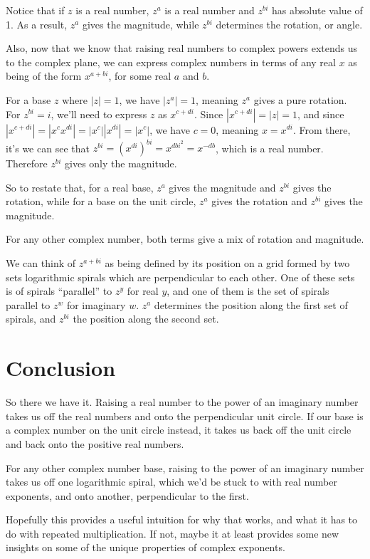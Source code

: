\documentclass[11pt, oneside]{article}   	%
\begin{document}
Notice that if $z$ is a real number, $z^a$ is a real number and $z^{bi}$ has absolute value of 1.
As a result, $z^a$ gives the magnitude, while $z^{bi}$ determines the rotation, or angle.

Also, now that we know that raising real numbers to complex powers extends us to the complex plane, we can express complex numbers in terms of any real $x$ as being of the form \(x^{a+bi}\), for some real $a$ and $b$.

For a base $z$ where $|z|=1$, we have $|z^a|=1$, meaning $z^a$ gives a pure rotation. 
For $z^{bi}=i$, we'll need to express $z$ as $x^{c+di}$. Since \(|x^{c+di}|=|z|=1\), and since \(|x^{c+di}|=|x^cx^{di}|=|x^c||x^{di}|=|x^c|\), we have $c=0$, meaning $x=x^{di}$.
From there, it's we can see that $z^{bi}=(x^{di})^{bi}=x^{dbi^2}=x^{-db}$, which is a real number. Therefore $z^{bi}$ gives only the magnitude.

So to restate that, for a real base, $z^a$ gives the magnitude and $z^{bi}$ gives the rotation, while for a base on the unit circle, $z^a$ gives the rotation and $z^{bi}$ gives the magnitude. 

For any other complex number, both terms give a mix of rotation and magnitude.

We can think of $z^{a+bi}$ as being defined by its position on a grid formed by two sets logarithmic spirals which are perpendicular to each other. One of these sets is of spirals ``parallel'' to $z^y$ for real $y$, and one of them is the set of spirals parallel to $z^{w}$ for imaginary $w$.
$z^a$ determines the position along the first set of spirals, and $z^{bi}$ the position along the second set.

\section{Conclusion}

So there we have it. Raising a real number to the power of an imaginary number takes us off the real numbers and onto the perpendicular unit circle. If our base is a complex number on the unit circle instead, it takes us back off the unit circle and back onto the positive real numbers.

For any other complex number base, raising to the power of an imaginary number takes us off one logarithmic spiral, which we'd be stuck to with real number exponents, and onto another, perpendicular to the first.

Hopefully this provides a useful intuition for why that works, and what it has to do with repeated multiplication. If not, maybe it at least provides some new insights on some of the unique properties of complex exponents.
\end{document}
